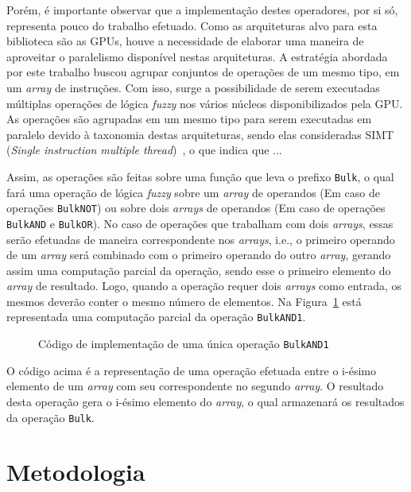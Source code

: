 \documentclass[12pt]{article}
\begin{document}
{Porém, é importante observar que a implementação destes operadores, por si só, representa pouco do trabalho efetuado. Como as arquiteturas alvo para esta biblioteca são as GPUs, houve a necessidade de elaborar uma maneira de aproveitar o paralelismo disponível nestas arquiteturas. A estratégia abordada por este trabalho buscou agrupar conjuntos de operações de um mesmo tipo, em um \textit{array} de instruções. Com isso, surge a possibilidade de serem executadas múltiplas operações de lógica \textit{fuzzy} nos vários núcleos disponibilizados pela GPU. As operações são agrupadas em um mesmo tipo para serem executadas em paralelo devido à taxonomia destas arquiteturas, sendo elas consideradas SIMT (\textit{Single instruction multiple thread})~\cite{keckler:11}, o que indica que ...

Assim, as operações são feitas sobre uma função que leva o prefixo \texttt{Bulk}, o qual fará uma operação de lógica \textit{fuzzy} sobre um \textit{array} de operandos (Em caso de operações \texttt{BulkNOT}) ou sobre dois \textit{arrays} de operandos (Em caso de operações \texttt{BulkAND} e \texttt{BulkOR}). No caso de operações que trabalham com dois \textit{arrays}, essas serão efetuadas de maneira correspondente nos \textit{arrays}, i.e., o primeiro operando de um \textit{array} será combinado com o primeiro operando do outro \textit{array}, gerando assim uma computação parcial da operação, sendo esse o primeiro elemento do \textit{array} de resultado. Logo, quando a operação requer dois \textit{arrays} como entrada, os mesmos deverão conter o mesmo número de elementos. Na Figura~\ref{fig:bulkoperation} está representada uma computação parcial da operação \texttt{BulkAND1}.

\begin{figure}[!h]
\centering

\caption{Código de implementação de uma única operação \texttt{BulkAND1}}
\label{fig:bulkoperation}
\end{figure}

O código acima é a representação de uma operação efetuada entre o i-ésimo elemento de um \textit{array} com seu correspondente no segundo \textit{array}. O resultado desta operação gera o i-ésimo elemento do \textit{array}, o qual armazenará os resultados da operação \texttt{Bulk}.

\section{Metodologia}
\label{sec:metodologia}	

}
\end{document}
